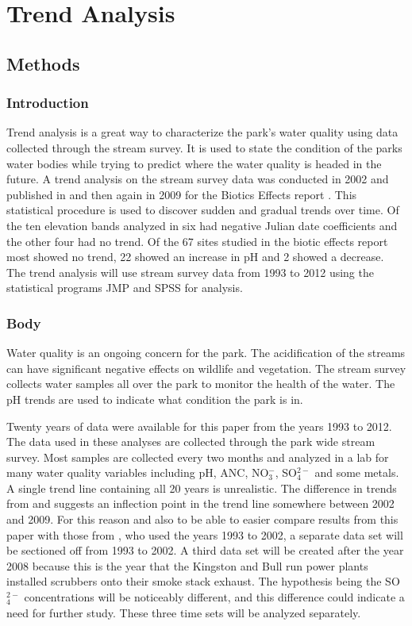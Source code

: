\chapter{Trend Analysis}\label{ch:TA}
\section{Methods}
\subsection{Introduction}

Trend analysis is a great way to characterize the park's water quality using data collected through the stream survey. It is used to state the condition of the parks water bodies while trying to predict where the water quality is headed in the future. A trend analysis on the stream survey data was conducted in 2002 and published in \citep{robinson2008ph} and then again in 2009 for the Biotics Effects report \citep{cai2012}. This statistical procedure is used to discover sudden and gradual trends over time. Of the ten elevation bands analyzed in \citep{robinson2008ph} six had negative Julian date coefficients and the other four had no trend. Of the 67 sites studied in the biotic effects report most showed no trend, 22 showed an increase in pH and 2 showed a decrease\citep{cai2012}. The trend analysis will use stream survey data from 1993 to 2012 using the statistical programs JMP and SPSS for analysis.

\subsection{Body}

Water quality is an ongoing concern for the park. The acidification of the streams can have significant negative effects on wildlife and vegetation. The stream survey collects water samples all over the park to monitor the health of the water. The pH trends are used to indicate what condition the park is in.
	
Twenty years of data were available for this paper from the years 1993 to 2012. The data used in these analyses are collected through the park wide stream survey. Most samples are collected every two months and analyzed in a lab for many water quality variables including pH, ANC, NO$_3^-$, SO$_4^{2-}$ and some metals. %
A single trend line containing all 20 years is unrealistic. The difference in trends from \citet{robinson2008ph} and \citet{cai2012} suggests an inflection point in the trend line somewhere between 2002 and 2009. For this reason and also to be able to easier compare results from this paper with those from \citet{robinson2008ph}, who used the years 1993 to 2002, a separate data set will be sectioned off from 1993 to 2002. A third data set will be created after the year 2008 because this is the year that the Kingston and Bull run power plants installed scrubbers onto their smoke stack exhaust. The hypothesis being the SO$_4^{2-}$ concentrations will be noticeably different, and this difference could indicate a need for further study. These three time sets will be analyzed separately.

